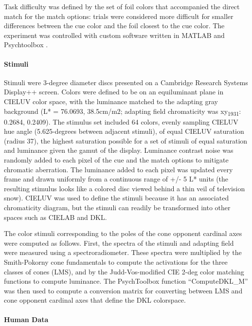 Task difficulty was defined by the set of foil colors that accompanied the direct match for the match options: trials were considered more difficult for smaller differences between the cue color and the foil closest to the cue color. 
The experiment was controlled with custom software written in MATLAB and Psychtoolbox \citep{noauthor_nei-lsrkofiko_2022, kleiner_whats_2007}.

\paragraph{Stimuli}
Stimuli were 3-degree diameter discs presented on a Cambridge Research Systems Display++ screen. 
Colors were defined to be on an equiluminant plane in CIELUV color space, with the luminance matched to the adapting gray background (L* = 76.0693, 38.5cm/m2; adapting field chromaticity was xy\textsubscript{1931}: 0.2684, 0.2409). 
The stimulus set included 64 colors, evenly sampling CIELUV hue angle (5.625-degrees between adjacent stimuli), of equal CIELUV saturation (radius 37), the highest saturation possible for a set of stimuli of equal saturation and luminance given the gamut of the display.
Luminance contrast noise was randomly added to each pixel of the cue and the match options to mitigate chromatic aberration. 
The luminance added to each pixel was updated every frame and drawn uniformly from a continuous range of +/- 5 L* units (the resulting stimulus looks like a colored disc viewed behind a thin veil of television snow). 
CIELUV was used to define the stimuli because it has an associated chromaticity diagram, but the stimuli can readily be transformed into other spaces such as CIELAB and DKL. 

The color stimuli corresponding to the poles of the cone opponent cardinal axes were computed as follows. 
First, the spectra of the stimuli and adapting field were measured using a spectroradiometer. 
These spectra were multiplied by the Smith-Pokorny cone fundamentals to compute the activations for the three classes of cones (LMS), and by the Judd-Vos-modified CIE 2-deg color matching functions to compute luminance. 
The PsychToolbox function “ComputeDKL\_M” was then used to compute a conversion matrix for converting between LMS and cone opponent cardinal axes that define the DKL colorspace. 

\paragraph{Human Data}


